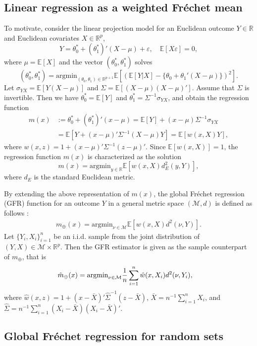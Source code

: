 \documentclass[11pt,reqno]{amsart}
\begin{document}
\subsection{Linear regression as a weighted Fr\'echet mean}

To motivate, consider the linear projection model for an Euclidean outcome $Y\in\mathbb{R}$ and Euclidean covariates $X \in \mathbb{R}^p$,  
\[
Y=\theta_0^*+(\theta_1^*)'(X-\mu)+\varepsilon,\quad\mathbb{E}[X\varepsilon]=0,
\]
where $\mu=\mathbb{E}[X]$ and the vector $(\theta_0^*,\theta_1^*)$ solves
\[
(\theta_0^*,\theta_1^*)=\mathrm{argmin}_{(\theta_0,\theta_1) \in\mathbb{R}^{p+1}}\mathbb{E}[(\mathbb{E}[Y|X]-\{\theta_{0}+\theta_{1}'(X-\mu)\})^{2}].
\]
Let $\sigma_{YX}=\mathbb{E}[Y(X-\mu)]$ and $\Sigma=\mathbb{E}[(X-\mu)(X-\mu)']$. Assume that $\Sigma$ is invertible. Then we have $\theta_0^*=\mathbb{E}[Y]$ and $\theta_1^*=\Sigma^{-1}\sigma_{YX}$, and obtain the regression function
\begin{align*}
m(x) & :=\theta_0^*+(\theta_1^*)'(x-\mu)
 =\mathbb{E}[Y]+(x-\mu)\Sigma^{-1}\sigma_{YX}\\
& =\mathbb{E}[Y+(x-\mu)'\Sigma^{-1}(X-\mu)Y]
 =\mathbb{E}[w(x,X)Y],
\end{align*}
where $w(x,z)=1+(x-\mu)'\Sigma^{-1}(z-\mu)'$. Since $\mathbb{E}[w(x,X)]=1$, the regression function $m(x)$ is characterized as the solution 
\[
m(x)=\mathrm{argmin}_{y\in\mathbb{R}}\mathbb{E}[w(x,X)d_{E}^2(y,Y)],
\]
where $d_E$ is the standard Euclidean metric.

By extending the above representation of $m(x)$, the global Fr\'echet regression (GFR) function for an outcome $Y$ in a general metric space $(\mathcal{M},d)$ is defined as follows \citep{PeMu19}:
\begin{align*}
m_{\oplus}(x)=\mathrm{argmin}_{\nu\in\mathcal{M}}\mathbb{E}[w(x,X)d^{2}(\nu,Y)].
\end{align*}
Let $\{Y_i,X_i\}_{i=1}^n$ be an i.i.d. sample from the joint distribution of $(Y,X)\in \mathcal{M}\times \mathbb{R}^p$. Then the GFR estimator is given as the sample counterpart of $m_{\oplus}$, that is
\begin{align}\label{eq:sGFR-def}
\hat{m}_{\oplus}(x) & =\mathrm{argmin}_{\nu\in\mathcal{M}}{1\over n}\sum_{i=1}^n\hat{w}(x,X_i)d^{2}(\nu,Y_i),
\end{align}
where $\hat{w}(x,z)=1+(x-\bar{X})'\hat{\Sigma}^{-1}(z-\bar{X})$, $\bar{X}=n^{-1}\sum_{i=1}^n X_i$, and $\hat{\Sigma}=n^{-1}\sum_{i=1}^n (X_i-\bar{X})(X_i-\bar{X})'$.

\subsection{Global Fr\'echet regression for random sets}
\end{document}
